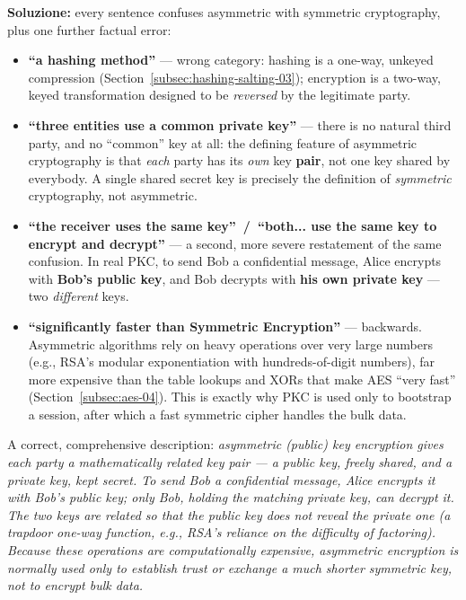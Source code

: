 \documentclass[12pt, a4paper]{article}
\begin{document}
\textbf{Soluzione:} every sentence confuses asymmetric with symmetric cryptography, plus one further factual error:
\begin{itemize}
    \item \textbf{``a hashing method''} --- wrong category: hashing is a one-way, unkeyed compression (Section~\ref{subsec:hashing-salting-03}); encryption is a two-way, keyed transformation designed to be \emph{reversed} by the legitimate party.
    \item \textbf{``three entities use a common private key''} --- there is no natural third party, and no ``common'' key at all: the defining feature of asymmetric cryptography is that \emph{each} party has its \emph{own} key \textbf{pair}, not one key shared by everybody. A single shared secret key is precisely the definition of \emph{symmetric} cryptography, not asymmetric.
    \item \textbf{``the receiver uses the same key''\ /\ ``both... use the same key to encrypt and decrypt''} --- a second, more severe restatement of the same confusion. In real PKC, to send Bob a confidential message, Alice encrypts with \textbf{Bob's public key}, and Bob decrypts with \textbf{his own private key} --- two \emph{different} keys.
    \item \textbf{``significantly faster than Symmetric Encryption''} --- backwards. Asymmetric algorithms rely on heavy operations over very large numbers (e.g., RSA's modular exponentiation with hundreds-of-digit numbers), far more expensive than the table lookups and XORs that make AES ``very fast'' (Section~\ref{subsec:aes-04}). This is exactly why PKC is used only to bootstrap a session, after which a fast symmetric cipher handles the bulk data.
\end{itemize}
A correct, comprehensive description: \textit{asymmetric (public) key encryption gives each party a mathematically related key pair --- a public key, freely shared, and a private key, kept secret. To send Bob a confidential message, Alice encrypts it with Bob's public key; only Bob, holding the matching private key, can decrypt it. The two keys are related so that the public key does not reveal the private one (a trapdoor one-way function, e.g., RSA's reliance on the difficulty of factoring). Because these operations are computationally expensive, asymmetric encryption is normally used only to establish trust or exchange a much shorter symmetric key, not to encrypt bulk data.}
\end{document}
